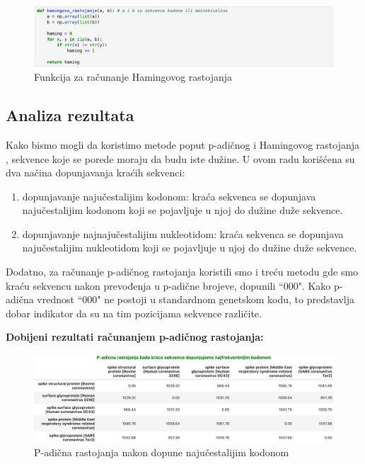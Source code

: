 \documentclass[a4paper,12pt]{article}
\begin{document}
\begin{figure}[h!]
  \centering
  \includegraphics[width=1\textwidth]{slika11.jpeg}
  \caption{Funkcija za računanje Hamingovog rastojanja}
  \label{fig:my_label}
\end{figure}

\subsection{Analiza rezultata}
Kako bismo mogli da koristimo metode poput p-adičnog i Hamingovog rastojanja , sekvence koje se porede moraju da budu iste dužine. U ovom radu korišćena su dva načina dopunjavanja kraćih sekvenci:
\begin{enumerate}
    \item dopunjavanje najučestalijim kodonom: kraća sekvenca se dopunjava najučestalijim kodonom koji se pojavljuje u njoj do dužine duže sekvence.
    \item dopunjavanje najnajučestalijim nukleotidom: kraća sekvenca se dopunjava najučestalijim nukleotidom koji se pojavljuje u njoj do dužine duže sekvence.
\end{enumerate}
Dodatno, za računanje p-adičnog rastojanja koristili smo i treću metodu gde smo kraću sekvencu  nakon prevođenja u p-adične brojeve, dopunili “000".  Kako p-adična vrednost “000" ne postoji u standardnom genetskom kodu, to predstavlja dobar indikator da su na tim pozicijama sekvence različite.

\bigskip
\noindent
\textbf{Dobijeni rezultati računanjem p-adičnog rastojanja:}
\bigskip

\begin{figure}[h!]
  \centering
  \includegraphics[width=1.0\textwidth]{slika12.jpeg}
  \caption{P-adična rastojanja nakon dopune najučestalijim kodonom}
  \label{fig:my_label}
\end{figure}
\end{document}
